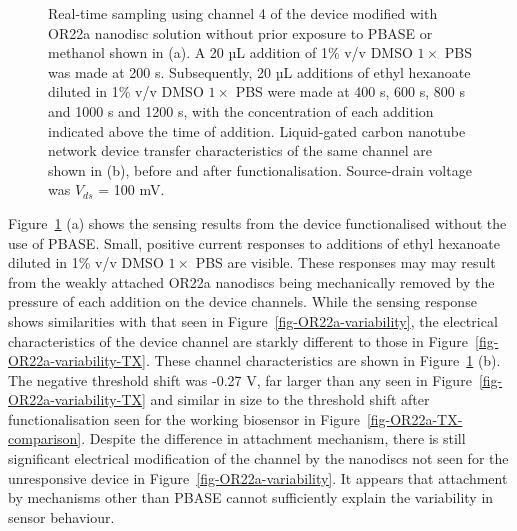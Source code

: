 \documentclass[
  a4paper,
]{scrbook}
\begin{document}
\begin{figure}
\begin{minipage}[t]{0.01\linewidth}
{}

\end{minipage}%

\caption{\label{fig-OR22a-variability-noPBASE}Real-time sampling using
channel 4 of the device modified with OR22a nanodisc solution without
prior exposure to PBASE or methanol shown in (a). A 20 µL addition of
1\% v/v DMSO \(1 \times\) PBS was made at 200 s. Subsequently, 20 µL
additions of ethyl hexanoate diluted in 1\% v/v DMSO \(1 \times\) PBS
were made at 400 s, 600 s, 800 s and 1000 s and 1200 s, with the
concentration of each addition indicated above the time of addition.
Liquid-gated carbon nanotube network device transfer characteristics of
the same channel are shown in (b), before and after functionalisation.
Source-drain voltage was \(V_{ds}\) = 100 mV.}

\end{figure}

Figure~\ref{fig-OR22a-variability-noPBASE} (a) shows the sensing results
from the device functionalised without the use of PBASE. Small, positive
current responses to additions of ethyl hexanoate diluted in 1\% v/v
DMSO \(1 \times\) PBS are visible. These responses may may result from
the weakly attached OR22a nanodiscs being mechanically removed by the
pressure of each addition on the device channels. While the sensing
response shows similarities with that seen in
Figure~\ref{fig-OR22a-variability}, the electrical characteristics of
the device channel are starkly different to those in
Figure~\ref{fig-OR22a-variability-TX}. These channel characteristics are
shown in Figure~\ref{fig-OR22a-variability-noPBASE} (b). The negative
threshold shift was -0.27 V, far larger than any seen in
Figure~\ref{fig-OR22a-variability-TX} and similar in size to the
threshold shift after functionalisation seen for the working biosensor
in Figure~\ref{fig-OR22a-TX-comparison}. Despite the difference in
attachment mechanism, there is still significant electrical modification
of the channel by the nanodiscs not seen for the unresponsive device in
Figure~\ref{fig-OR22a-variability}. It appears that attachment by
mechanisms other than PBASE cannot sufficiently explain the variability
in sensor behaviour.
\end{document}
